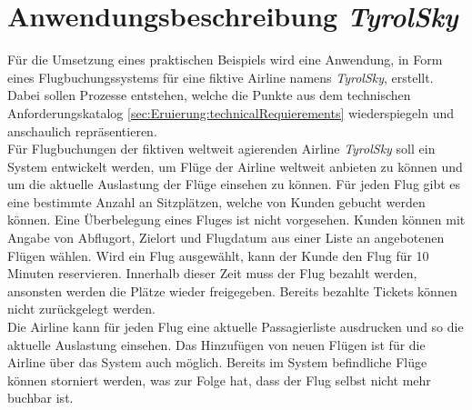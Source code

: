 \section{Anwendungsbeschreibung \textit{TyrolSky}}
Für die Umsetzung eines praktischen Beispiels wird eine Anwendung, in Form eines Flugbuchungssystems für eine fiktive Airline namens \textit{TyrolSky}, erstellt. Dabei sollen Prozesse entstehen, welche die Punkte aus dem technischen Anforderungskatalog \ref{sec:Eruierung:technicalRequierements} wiederspiegeln und anschaulich repräsentieren. \\
Für Flugbuchungen der fiktiven weltweit agierenden Airline \textit{TyrolSky} soll ein System entwickelt werden, um Flüge der Airline weltweit anbieten zu können und um die aktuelle Auslastung der Flüge einsehen zu können. Für jeden Flug gibt es eine bestimmte Anzahl an Sitzplätzen, welche von Kunden gebucht werden können. Eine Überbelegung eines Fluges ist nicht vorgesehen. Kunden können mit Angabe von Abflugort, Zielort und Flugdatum aus einer Liste an angebotenen Flügen wählen. Wird ein Flug ausgewählt, kann der Kunde den Flug für 10 Minuten reservieren. Innerhalb dieser Zeit muss der Flug bezahlt werden, ansonsten werden die Plätze wieder freigegeben. Bereits bezahlte Tickets können nicht zurückgelegt werden. \\
Die Airline kann für jeden Flug eine aktuelle Passagierliste ausdrucken und so die aktuelle Auslastung einsehen. Das Hinzufügen von neuen Flügen ist für die Airline über das System auch möglich. Bereits im System befindliche Flüge können storniert werden, was zur Folge hat, dass der Flug selbst nicht mehr buchbar ist. \\

